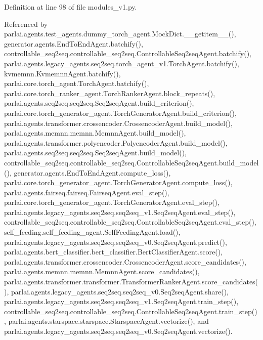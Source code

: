 Definition at line 98 of file modules\+\_\+v1.\+py.



Referenced by parlai.\+agents.\+test\+\_\+agents.\+dummy\+\_\+torch\+\_\+agent.\+Mock\+Dict.\+\_\+\+\_\+getitem\+\_\+\+\_\+(), generator.\+agents.\+End\+To\+End\+Agent.\+batchify(), controllable\+\_\+seq2seq.\+controllable\+\_\+seq2seq.\+Controllable\+Seq2seq\+Agent.\+batchify(), parlai.\+agents.\+legacy\+\_\+agents.\+seq2seq.\+torch\+\_\+agent\+\_\+v1.\+Torch\+Agent.\+batchify(), kvmemnn.\+Kvmemnn\+Agent.\+batchify(), parlai.\+core.\+torch\+\_\+agent.\+Torch\+Agent.\+batchify(), parlai.\+core.\+torch\+\_\+ranker\+\_\+agent.\+Torch\+Ranker\+Agent.\+block\+\_\+repeats(), parlai.\+agents.\+seq2seq.\+seq2seq.\+Seq2seq\+Agent.\+build\+\_\+criterion(), parlai.\+core.\+torch\+\_\+generator\+\_\+agent.\+Torch\+Generator\+Agent.\+build\+\_\+criterion(), parlai.\+agents.\+transformer.\+crossencoder.\+Crossencoder\+Agent.\+build\+\_\+model(), parlai.\+agents.\+memnn.\+memnn.\+Memnn\+Agent.\+build\+\_\+model(), parlai.\+agents.\+transformer.\+polyencoder.\+Polyencoder\+Agent.\+build\+\_\+model(), parlai.\+agents.\+seq2seq.\+seq2seq.\+Seq2seq\+Agent.\+build\+\_\+model(), controllable\+\_\+seq2seq.\+controllable\+\_\+seq2seq.\+Controllable\+Seq2seq\+Agent.\+build\+\_\+model(), generator.\+agents.\+End\+To\+End\+Agent.\+compute\+\_\+loss(), parlai.\+core.\+torch\+\_\+generator\+\_\+agent.\+Torch\+Generator\+Agent.\+compute\+\_\+loss(), parlai.\+agents.\+fairseq.\+fairseq.\+Fairseq\+Agent.\+eval\+\_\+step(), parlai.\+core.\+torch\+\_\+generator\+\_\+agent.\+Torch\+Generator\+Agent.\+eval\+\_\+step(), parlai.\+agents.\+legacy\+\_\+agents.\+seq2seq.\+seq2seq\+\_\+v1.\+Seq2seq\+Agent.\+eval\+\_\+step(), controllable\+\_\+seq2seq.\+controllable\+\_\+seq2seq.\+Controllable\+Seq2seq\+Agent.\+eval\+\_\+step(), self\+\_\+feeding.\+self\+\_\+feeding\+\_\+agent.\+Self\+Feeding\+Agent.\+load(), parlai.\+agents.\+legacy\+\_\+agents.\+seq2seq.\+seq2seq\+\_\+v0.\+Seq2seq\+Agent.\+predict(), parlai.\+agents.\+bert\+\_\+classifier.\+bert\+\_\+classifier.\+Bert\+Classifier\+Agent.\+score(), parlai.\+agents.\+transformer.\+crossencoder.\+Crossencoder\+Agent.\+score\+\_\+candidates(), parlai.\+agents.\+memnn.\+memnn.\+Memnn\+Agent.\+score\+\_\+candidates(), parlai.\+agents.\+transformer.\+transformer.\+Transformer\+Ranker\+Agent.\+score\+\_\+candidates(), parlai.\+agents.\+legacy\+\_\+agents.\+seq2seq.\+seq2seq\+\_\+v0.\+Seq2seq\+Agent.\+share(), parlai.\+agents.\+legacy\+\_\+agents.\+seq2seq.\+seq2seq\+\_\+v1.\+Seq2seq\+Agent.\+train\+\_\+step(), controllable\+\_\+seq2seq.\+controllable\+\_\+seq2seq.\+Controllable\+Seq2seq\+Agent.\+train\+\_\+step(), parlai.\+agents.\+starspace.\+starspace.\+Starspace\+Agent.\+vectorize(), and parlai.\+agents.\+legacy\+\_\+agents.\+seq2seq.\+seq2seq\+\_\+v0.\+Seq2seq\+Agent.\+vectorize().

